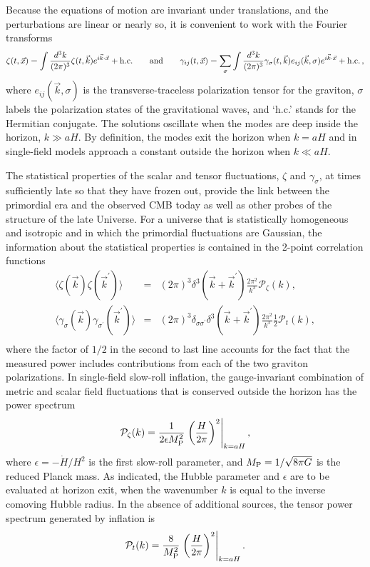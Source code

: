 Because the equations of motion are invariant under translations, and the perturbations are linear or nearly so, it is convenient to work with the Fourier transforms
\begin{equation}
\zeta(t,\vec{x})=\int \frac{d^3 k}{(2\pi)^3}\zeta(t,\vec{k})e^{i \vec{k}\cdot\vec{x}}+{\rm h.c.}\qquad{\rm and}\qquad\gamma_{ij}(t,\vec{x})=\sum\limits_\sigma\int\frac{d^3k}{(2\pi)^3}\gamma_\sigma(t,\vec{k})e_{ij}(\vec{k},\sigma)e^{i \vec{k}\cdot\vec{x}}+{\rm h.c.}\,,
\end{equation}
where $e_{ij}(\vec{k},\sigma)$ is the transverse-traceless polarization tensor for the graviton, $\sigma$ labels the polarization states of the gravitational waves,
and `h.c.' stands for the Hermitian conjugate. The solutions oscillate when the modes are deep inside the horizon, $k\gg aH$. By definition, the modes exit the horizon when $k=aH$ and in single-field models approach a constant outside the horizon when $k\ll aH$.

The statistical properties of the scalar and tensor fluctuations, $\zeta$ and $\gamma_\sigma$, at times sufficiently late so that they have frozen out, provide the link between the primordial era and the observed CMB today as well as other probes of the structure of the late Universe. For a universe that is statistically homogeneous and isotropic and in which the primordial fluctuations are Gaussian, the information about the statistical properties is contained in the 2-point correlation functions
\begin{eqnarray}
\langle\zeta(\vec{k})\zeta(\vec{k}^{\prime})\rangle&=&(2\pi)^3\delta^3(\vec{k}+\vec{k}^{\prime})\frac{2\pi^2}{k^3}\mathcal{P}_{\zeta}(k),\nonumber\\
\langle\gamma_\sigma(\vec{k})\gamma_{\sigma^{\prime}}(\vec{k}^{\prime})\rangle&=&(2\pi)^3\delta_{\sigma\sigma^{\prime}}\delta^3(\vec{k}+\vec{k}^{\prime})\frac{2\pi^2}{k^3}\frac{1}{2}\mathcal{P}_{t}(k),\nonumber\\
\end{eqnarray}
where the factor of $1/2$ in the second to last line accounts for the fact that the measured power includes contributions from each of the two graviton polarizations. In single-field slow-roll inflation, the gauge-invariant combination of metric and scalar field fluctuations that is conserved outside the horizon has the power spectrum
\begin{equation}
\label{eq:inf_Pzeta}
\mathcal{P}_{\zeta}(k)=\frac{1}{2\epsilon M_{\rm P}^2}\left.\left(\frac{H}{2\pi}\right)^2\right|_{k=aH},
\end{equation}
where $\epsilon=-\dot{H}/H^2$ is the first slow-roll parameter, and $M_{\rm P}=1/\sqrt{8\pi G}$ is the reduced Planck mass. As indicated, the Hubble parameter and $\epsilon$ are to be evaluated at horizon exit, when the wavenumber $k$ is equal to the inverse comoving Hubble radius. In the absence of additional sources, the tensor power spectrum generated by inflation is
\begin{equation}
\label{eq:inf_Pt}
\mathcal{P}_{t}(k)=\frac{8}{M_{\rm P}^2}\left.\left(\frac{H}{2\pi}\right)^2\right|_{k=aH}.
\end{equation}

